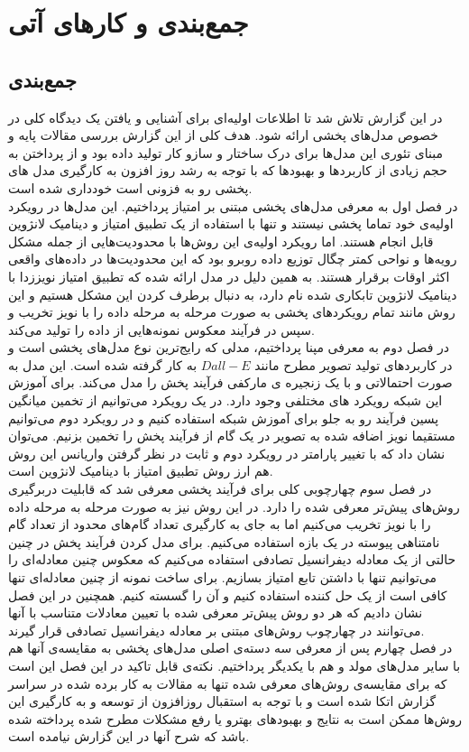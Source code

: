 
\chapter{جمع‌بندی و کارهای آتی}
\section{جمع‌بندی}
در این گزارش تلاش شد تا اطلاعات اولیه‌ای برای آشنایی و یافتن یک دیدگاه کلی در خصوص مدل‌های پخشی ارائه شود. هدف کلی از این گزارش بررسی مقالات پایه‌ و مبنای تئوری این مدل‌ها برای درک ساختار و سازو کار تولید داده بود و از پرداختن به حجم زیادی از کاربردها و بهبودها که با توجه به رشد روز افزون به کارگیری مدل های پخشی رو به فزونی است خودداری شده است.
\\
در فصل اول به معرفی مدل‌های پخشی مبتنی بر امتیاز پرداختیم. این مدل‌ها در رویکرد اولیه‌ی خود تماما پخشی نیستند و تنها با استفاده از یک تطبیق امتیاز و دینامیک لانژوین قابل انجام هستند. اما رویکرد اولیه‌ی این روش‌ها با محدودیت‌هایی از جمله مشکل رویه‌ها و نواحی کمتر چگال توزیع داده روبرو بود که این محدودیت‌ها در داده‌های واقعی اکثر اوقات برقرار هستند. به همین دلیل در مدل ارائه شده که تطبیق امتیاز نویززدا با دینامیک لانژوین تابکاری شده نام دارد، به دنبال برطرف کردن این مشکل هستیم و این روش مانند تمام رویکرد‌های پخشی به صورت مرحله به مرحله داده را با نویز تخریب و سپس در فرآیند معکوس نمونه‌هایی از داده را تولید می‌کند.
\\
در فصل دوم به معرفی مپنا پرداختیم، مدلی که رایج‌ترین نوع مدل‌های پخشی است و در کاربرد‌های تولید تصویر مطرح مانند $Dall-E$ به کار گرفته شده است. این مدل به صورت احتمالاتی و با یک زنجیره ی مارکفی فرآیند پخش را مدل می‌کند. برای آموزش این شبکه رویکرد های مختلفی وجود دارد. در یک رویکرد می‌توانیم از تخمین میانگین پسین فرآیند رو به جلو برای آموزش شبکه استفاده کنیم و در رویکرد دوم می‌توانیم مستقیما نویز اضافه شده به تصویر در یک گام از فرآیند پخش را تخمین بزنیم. می‌توان نشان داد که با تغییر پارامتر در رویکرد دوم و ثابت در نظر گرفتن واریانس این روش هم ارز روش تطبیق امتیاز با دینامیک لانژوین است.
\\
در فصل سوم چهارچوبی کلی برای فرآیند پخشی معرفی شد که قابلیت دربرگیری روش‌های پیش‌تر معرفی شده را دارد. در این روش نیز به صورت مرحله به مرحله داده را با نویز تخریب می‌کنیم اما به جای به کارگیری تعداد گام‌های محدود از تعداد گام نامتناهی پیوسته در یک بازه استفاده می‌کنیم. برای مدل کردن فرآیند پخش در چنین حالتی از یک معادله دیفرانسیل تصادفی استفاده می‌کنیم که معکوس چنین معادله‌ای را می‌توانیم تنها با داشتن تابع امتیاز بسازیم. برای ساخت نمونه از چنین معادله‌ای تنها کافی است از یک حل کننده استفاده کنیم و آن را گسسته کنیم.  همچنین در این فصل نشان دادیم که هر دو روش پیش‌تر معرفی شده با تعیین معادلات متناسب با آنها می‌توانند در چهارچوب روش‌های مبتنی بر معادله دیفرانسیل تصادفی قرار گیرند.
\\
در فصل چهارم پس از معرفی سه دسته‌ی اصلی مدل‌های پخشی به مقایسه‌ی آنها هم با سایر مدل‌های مولد و هم با یکدیگر پرداختیم. نکته‌ی قابل تاکید در این فصل این است که برای مقایسه‌ی روش‌های معرفی شده تنها به مقالات به کار برده شده در سراسر گزارش اتکا شده است و با توجه به استقبال روزافزون از توسعه و به کارگیری این روش‌ها ممکن است به نتایج و بهبود‌های بهترو یا رفع مشکلات مطرح شده پرداخته شده باشد که شرح آنها در این گزارش نیامده است.
\\
